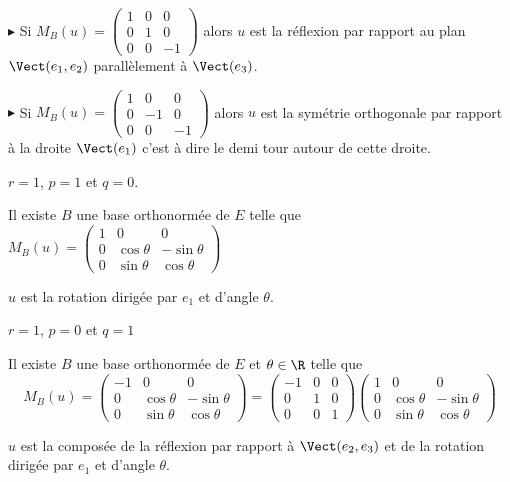 $\blacktriangleright$ Si $M_B(u) = \begin{pmatrix}
    1 & 0 & 0 \\
    0 & 1 & 0 \\
    0 & 0 & -1
\end{pmatrix}$ alors $u$ est la réflexion par rapport au plan $\Vect(e_1, e_2)$ parallèlement à $\Vect(e_3)$.

\avspace $\blacktriangleright$ Si $M_B(u) = \begin{pmatrix}
    1 & 0 & 0 \\
    0 & -1 & 0 \\
    0 & 0 & -1
    \end{pmatrix}$ alors $u$ est la symétrie orthogonale par rapport à la droite 
    $\Vect(e_1)$ c'est à dire le demi tour autour de cette droite. 

 $r = 1$, $p = 1$ et $q = 0$.

\svspace Il existe $B$ une base orthonormée de $E$ telle que $M_B(u) = \begin{pmatrix}
    1 & 0 & 0 \\
    0 & \cos \theta & -\sin \theta \\
    0 & \sin \theta & \cos \theta
\end{pmatrix}$

$u$ est la rotation dirigée par $e_1$ et d'angle $\theta$. 

 $r = 1$, $p = 0$ et $q = 1$

\svspace Il existe $B$ une base orthonormée de $E$ et $\theta \in \R$ telle que 
$$M_B(u) = \begin{pmatrix}
    -1 & 0 & 0 \\
    0 & \cos \theta & -\sin \theta \\
    0 & \sin \theta & \cos \theta
\end{pmatrix} = \begin{pmatrix}
    -1 & 0 & 0 \\
    0 & 1 & 0 \\
    0 & 0 & 1
\end{pmatrix} \begin{pmatrix}
    1 & 0 & 0 \\
    0 & \cos \theta & -\sin \theta \\
    0 & \sin \theta & \cos \theta
\end{pmatrix}$$

$u$ est la composée de la réflexion par rapport à $\Vect(e_2, e_3)$ et de la rotation
dirigée par $e_1$ et d'angle $\theta$.



